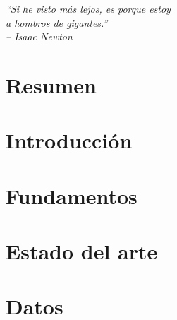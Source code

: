 \documentclass[11pt,a4paper,oneside]{report}
\begin{document}

\pagestyle{empty}



\cleardoublepage
\thispagestyle{empty}
\vspace*{\fill}
\begin{flushright}
  \itshape
  ``Si he visto más lejos, es porque estoy\\
  a hombros de gigantes.''\\[1em]
  -- Isaac Newton
\end{flushright}
\vspace*{\fill}

\cleardoublepage
\pagestyle{fancy}

\chapter*{Resumen}


\cleardoublepage
\tableofcontents
\cleardoublepage
{}
{}
\listoftables
\cleardoublepage
{}
{}
\listoffigures
\cleardoublepage
\printacronyms


\cleardoublepage
{}

\chapter{Introducción}
\label{cap:introduccion}


\chapter{Fundamentos}
\label{cap:fundamentos}


\chapter{Estado del arte}
\label{cap:estado-del-arte}


\chapter{Datos}
\label{cap:datos}

\end{document}
